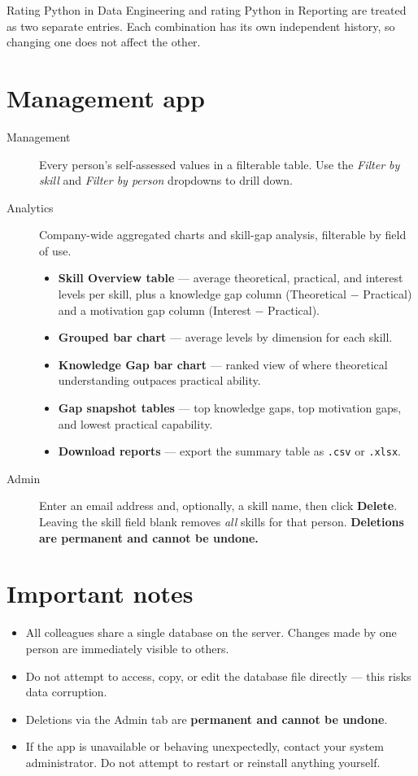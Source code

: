 \documentclass[11pt,a4paper]{article}
\begin{document}
Rating Python in Data Engineering and rating Python in Reporting are treated as two separate entries.
Each combination has its own independent history, so changing one does not affect the other.

\section*{Management app}

\begin{description}
\item[Management] Every person's self-assessed values in a filterable table.
  Use the \emph{Filter by skill} and \emph{Filter by person} dropdowns to drill down.
\item[Analytics] Company-wide aggregated charts and skill-gap analysis, filterable by field of use.
  \begin{itemize}
    \item \textbf{Skill Overview table} --- average theoretical, practical, and interest levels per skill,
      plus a knowledge gap column (Theoretical $-$ Practical) and a motivation gap column (Interest $-$ Practical).
    \item \textbf{Grouped bar chart} --- average levels by dimension for each skill.
    \item \textbf{Knowledge Gap bar chart} --- ranked view of where theoretical understanding outpaces practical ability.
    \item \textbf{Gap snapshot tables} --- top knowledge gaps, top motivation gaps, and lowest practical capability.
    \item \textbf{Download reports} --- export the summary table as \texttt{.csv} or \texttt{.xlsx}.
  \end{itemize}
\item[Admin] Enter an email address and, optionally, a skill name, then click \textbf{Delete}.
  Leaving the skill field blank removes \emph{all} skills for that person.
  \textbf{Deletions are permanent and cannot be undone.}
\end{description}

\section*{Important notes}

\begin{itemize}
  \item All colleagues share a single database on the server. Changes made by one person are immediately
    visible to others.
  \item Do not attempt to access, copy, or edit the database file directly --- this risks data corruption.
  \item Deletions via the Admin tab are \textbf{permanent and cannot be undone}.
  \item If the app is unavailable or behaving unexpectedly, contact your system administrator.
    Do not attempt to restart or reinstall anything yourself.
\end{itemize}
\end{document}
